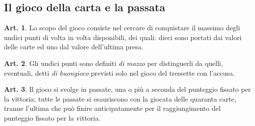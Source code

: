 \documentclass[italian,a4paper]{book}
\theoremstyle{definition}
\newtheorem{art}{Art.}
\begin{document}
\subsection{Il gioco della carta e la passata}
\begin{art}
    Lo scopo del gioco consiste nel cercare di conquistare il massimo degli undici punti di volta in volta disponibili, dei quali: dieci sono portati dai valori delle carte ed uno dal valore dell'ultima presa.
\end{art}
\begin{art}
    Gli undici punti sono definiti \emph{di
    mazzo} per distinguerli da quelli, eventuali, detti \emph{di buongioco} previsti solo nel gioco del tressette con l'accusa.
\end{art}
\begin{art}
    Il gioco si svolge in passate, una o più a seconda del punteggio fissato per la vittoria; tutte le passate si esauriscono con la giocata delle quaranta carte, tranne l'ultima che può finire anticipatamente per il raggiungimento del punteggio fissato per la vittoria.
\end{art}
\end{document}
